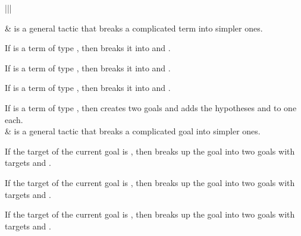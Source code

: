 \documentclass[letterpaper,10pt,english]{sphinxmanual}
\begin{document}
\begin{savenotes}\sphinxattablestart
\centering
\begin{tabular}[t]{|||}
\hline

\sphinxAtStartPar
{}
&
\sphinxAtStartPar
{} is a general tactic that breaks a complicated term into simpler ones.

\sphinxAtStartPar
If  is a term of type , then
 breaks it into  and .

\sphinxAtStartPar
If  is a term of type , then
 breaks it into  and .

\sphinxAtStartPar
If  is a term of type , then
 breaks it into  and .

\sphinxAtStartPar
If  is a term of type , then
 creates two goals and adds the hypotheses  and  to one each.
\\
\hline
\sphinxAtStartPar
{}
&
\sphinxAtStartPar
{} is a general tactic that breaks a complicated goal into simpler ones.

\sphinxAtStartPar
If the target of the current goal is , then
 breaks up the goal into two goals with targets  and .

\sphinxAtStartPar
If the target of the current goal is , then
 breaks up the goal into two goals with targets  and .

\sphinxAtStartPar
If the target of the current goal is , then
 breaks up the goal into two goals with targets  and .


\end{tabular}
\end{savenotes}
\end{document}
